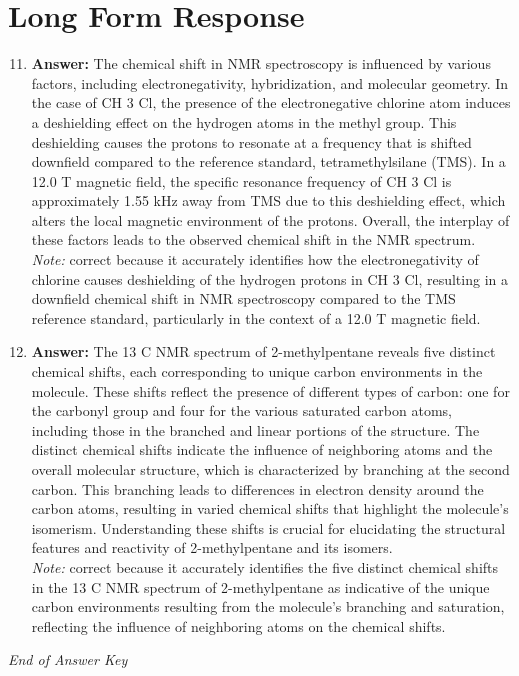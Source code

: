 \documentclass[12pt]{article}
\begin{document}
\section*{Long Form Response}
\begin{enumerate}[label=\arabic*.]
\setcounter{enumi}{10}
\item \textbf{Answer:} The chemical shift in NMR spectroscopy is influenced by various factors, including electronegativity, hybridization, and molecular geometry. In the case of CH 3 Cl, the presence of the electronegative chlorine atom induces a deshielding effect on the hydrogen atoms in the methyl group. This deshielding causes the protons to resonate at a frequency that is shifted downfield compared to the reference standard, tetramethylsilane (TMS). In a 12.0 T magnetic field, the specific resonance frequency of CH 3 Cl is approximately 1.55 kHz away from TMS due to this deshielding effect, which alters the local magnetic environment of the protons. Overall, the interplay of these factors leads to the observed chemical shift in the NMR spectrum.
\\ \textit{Note:} correct because it accurately identifies how the electronegativity of chlorine causes deshielding of the hydrogen protons in CH 3 Cl, resulting in a downfield chemical shift in NMR spectroscopy compared to the TMS reference standard, particularly in the context of a 12.0 T magnetic field.
\item \textbf{Answer:} The 13 C NMR spectrum of 2-methylpentane reveals five distinct chemical shifts, each corresponding to unique carbon environments in the molecule. These shifts reflect the presence of different types of carbon: one for the carbonyl group and four for the various saturated carbon atoms, including those in the branched and linear portions of the structure. The distinct chemical shifts indicate the influence of neighboring atoms and the overall molecular structure, which is characterized by branching at the second carbon. This branching leads to differences in electron density around the carbon atoms, resulting in varied chemical shifts that highlight the molecule's isomerism. Understanding these shifts is crucial for elucidating the structural features and reactivity of 2-methylpentane and its isomers.
\\ \textit{Note:} correct because it accurately identifies the five distinct chemical shifts in the 13 C NMR spectrum of 2-methylpentane as indicative of the unique carbon environments resulting from the molecule's branching and saturation, reflecting the influence of neighboring atoms on the chemical shifts.
\end{enumerate}

\vfill
\noindent\textit{End of Answer Key}
\end{document}
